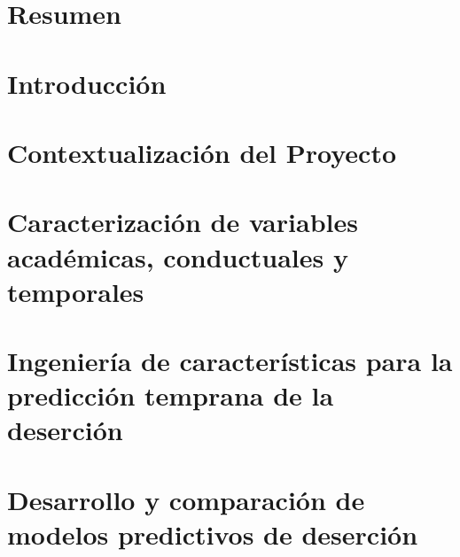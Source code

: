 \documentclass[11pt,twoside,openany]{thesis}
\let\cleardoublepage\clearpage
\begin{document}
\raggedbottom
\renewcommand{\tablename}{Tabla}
\renewcommand{\listtablename}{Índice de tablas}


\frontmatter


\chapter*{Resumen} 

  
  
 \tableofcontents 
\listoffigures   
\listoftables   

\mainmatter


\dominitoc
\cleardoublepage

\chapter{Introducción}


\chapter{Contextualización del Proyecto}


\chapter{Caracterización de variables académicas, conductuales y temporales}


\chapter{Ingeniería de características para la predicción temprana de la deserción}


\chapter{Desarrollo y comparación de modelos predictivos de deserción}

\end{document}
